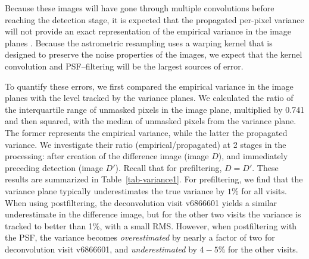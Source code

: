 \documentclass[prd, nofootinbib, floatfix, 11pt,tightenlines,times]{article}
\begin{document}
Because these images will have gone through multiple convolutions
before reaching the detection stage, it is expected that the
propagated per-pixel variance will not provide an exact representation
of the empirical variance in the image planes \citep{Price-Stacking}.
Because the astrometric resampling uses a warping kernel that is
designed to preserve the noise properties of the images, we expect
that the kernel convolution and PSF--filtering will be the largest
sources of error.

To quantify these errors, we first compared the empirical variance in
the image planes with the level tracked by the variance planes.  We
calculated the ratio of the interquartile range of unmasked pixels in
the image plane, multiplied by 0.741 and then squared, with the median
of unmasked pixels from the variance plane.  The former represents the
empirical variance, while the latter the propagated variance.  We
investigate their ratio (empirical/propagated) at 2 stages in the
processing: after creation of the difference image (image $D$), and
immediately preceding detection (image $D'$).  Recall that for
prefiltering, $D = D'$.  These results are summarized in
Table~\ref{tab-variance1}.  For prefiltering, we find that the
variance plane typically underestimates the true variance by $1\%$ for
all visits.  When using postfiltering, the deconvolution visit
v6866601 yields a similar underestimate in the difference image, but
for the other two visits the variance is tracked to better than 1\%,
with a small RMS.  However, when postfiltering with the PSF, the
variance becomes {\it overestimated} by nearly a factor of two for
deconvolution visit v6866601, and {\it underestimated} by $4-5\%$ for
the other visits.
\end{document}
